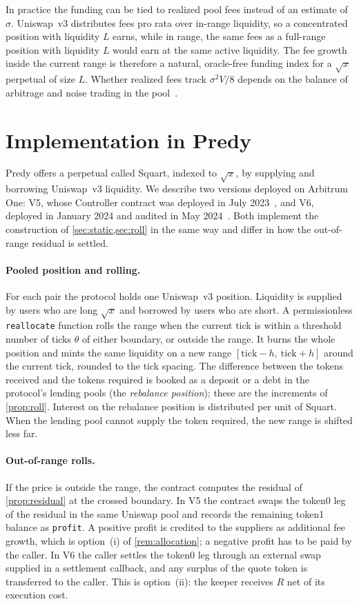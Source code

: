 \documentclass[11pt]{article}
\theoremstyle{definition}
\theoremstyle{remark}
\begin{document}
In practice the funding can be tied to realized pool fees instead of an estimate of $\sigma$. Uniswap~v3 distributes fees pro rata over in-range liquidity, so a concentrated position with liquidity $L$ earns, while in range, the same fees as a full-range position with liquidity $L$ would earn at the same active liquidity. The fee growth inside the current range is therefore a natural, oracle-free funding index for a $\sqrt{x}$ perpetual of size $L$. Whether realized fees track $\sigma^2V/8$ depends on the balance of arbitrage and noise trading in the pool~\cite{milionis2022lvr}.

\section{Implementation in Predy}\label{sec:predy}

Predy offers a perpetual called Squart, indexed to $\sqrt{x}$, by supplying and borrowing Uniswap~v3 liquidity. We describe two versions deployed on Arbitrum One: V5, whose Controller contract was deployed in July 2023~\cite{predy2023sqrt}, and V6, deployed in January 2024 and audited in May 2024~\cite{predy2024c4}. Both implement the construction of \cref{sec:static,sec:roll} in the same way and differ in how the out-of-range residual is settled.

\paragraph{Pooled position and rolling.} For each pair the protocol holds one Uniswap~v3 position. Liquidity is supplied by users who are long $\sqrt{x}$ and borrowed by users who are short. A permissionless \texttt{reallocate} function rolls the range when the current tick is within a threshold number of ticks $\theta$ of either boundary, or outside the range. It burns the whole position and mints the same liquidity on a new range $[\text{tick}-h,\ \text{tick}+h]$ around the current tick, rounded to the tick spacing. The difference between the tokens received and the tokens required is booked as a deposit or a debt in the protocol's lending pools (the \emph{rebalance position}); these are the increments of \cref{prop:roll}. Interest on the rebalance position is distributed per unit of Squart. When the lending pool cannot supply the token required, the new range is shifted less far.

\paragraph{Out-of-range rolls.} If the price is outside the range, the contract computes the residual of \cref{prop:residual} at the crossed boundary. In V5 the contract swaps the token0 leg of the residual in the same Uniswap pool and records the remaining token1 balance as \texttt{profit}. A positive profit is credited to the suppliers as additional fee growth, which is option~(i) of \cref{rem:allocation}; a negative profit has to be paid by the caller. In V6 the caller settles the token0 leg through an external swap supplied in a settlement callback, and any surplus of the quote token is transferred to the caller. This is option~(ii): the keeper receives $R$ net of its execution cost.
\end{document}
